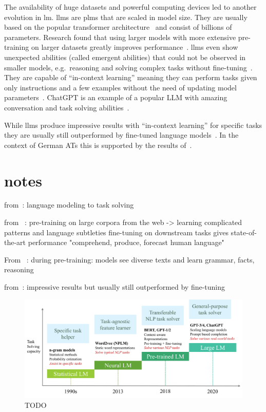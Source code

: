 The availability of huge datasets and powerful computing devices led to another evolution in \gls{lm}.
\glspl{llm} are \glspl{plm} that are scaled in model size.
They are usually based on the popular transformer architecture~\autocite{Hadi_2023} and consist of billions of parameters.
Research found that using larger models with more extensive pre-training on larger datasets greatly improves performance~\autocite{Raiaan2024ARO}.
\glspl{llm} even show unexpected abilities (called emergent abilities) that could not be observed in smaller models, e.g.\ reasoning and solving complex tasks without fine-tuning~\autocite{zhao2023survey}.
They are capable of \enquote{in-context learning} meaning they can perform tasks given only instructions and a few examples without the need of updating model parameters~\autocite{bhatia2023tart}.
ChatGPT is an example of a popular \gls{LLM} with amazing conversation and task solving abilities~\autocite{zhao2023survey}.

While \glspl{llm} produce impressive results with \enquote{in-context learning} for specific tasks they are usually still outperformed by fine-tuned language models~\autocite{bhatia2023tart}.
In the context of German \gls{ATs} this is supported by the results of~\autocite{deilen2023using}.


\section{notes}

from~\autocite{zhao2023survey}:
language modeling to task solving

from ~\autocite{Raiaan2024ARO}:
pre-training on large corpora from the web -> learning complicated patterns and language subtleties
fine-tuning on downstream tasks gives state-of-the-art performance
"comprehend, produce, forecast human language"

From ~\autocite{Hadi_2023}:
during pre-training: models see diverse texts and learn grammar, facts, reasoning

from~\autocite{bhatia2023tart}:
impressive results but usually still outperformed by fine-tuning

\begin{figure}
    \centering
    \includegraphics[width=\linewidth]{images/languagemodels}
    \caption[TODO.]{TODO~\autocite{zhao2023survey}}
    \label{fig:language-models}
\end{figure}
